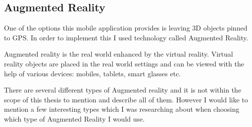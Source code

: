 \documentclass[thesis=M,english]{FITthesis}[2012/10/20]
\begin{document}
 
\subsection{Augmented Reality}

One of the options this mobile application provides is leaving 3D objects pinned to GPS. In order to implement this I used technology called  Augmented Reality.

Augmented reality is the real world enhanced by the virtual reality. Virtual reality objects are placed in the real world settings and can be viewed with the help of various devices: mobiles, tablets, smart glasses etc.

There are several different types of Augmented reality and it is not within the scope of this thesis to mention and describe all of them. However I would like to mention a few interesting types which I was researching about when choosing which type of Augmented Reality I would use.
\end{document}
